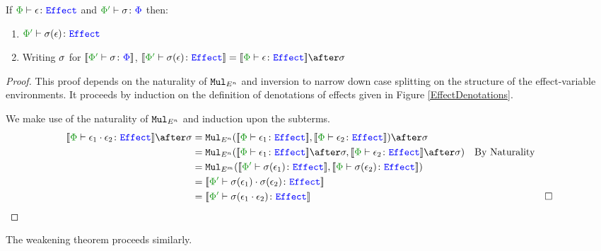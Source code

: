 \begin{framed}
    \begin{theorem}\label{EffectSubstitutionOnEffects} 
        If $\wellformedeffect{\P}{\e}$ and $\typerelation{\P'}{\si}{\P}$ then: 
        \begin{enumerate}[label=\roman*.]
            \item $\wellformedeffect{\P'}{\si(\e)}$
            \item Writing $\sigma$ for $\deno{\typerelation{\P'}{\si}{\P}}$,  $\deno{\wellformedeffect{\P'}{\si(\e)}} = \deno{\wellformedeffect{\P}{\e}}\after\si$
        \end{enumerate}
          
    \end{theorem}
    
    \begin{proof}
        This proof depends on the naturality of $\texttt{Mul}_{E^n}$ and inversion to narrow down case splitting on the structure of the effect-variable environments. It proceeds by induction on the definition of denotations of effects given in Figure \ref{EffectDenotations}.
    
    \case{\ecompose}
    
    We make use of the naturality of $\texttt{Mul}_{E^n}$ and induction upon the subterms.
    \begin{align*}
        \deno{\typerelation{\P}{\e_1\dot\e_2}{\effect}} \after\si &=
        \Mul_{E^n}(\deno{\typerelation{\P}{\e_1}{\effect}}, \deno{\typerelation{\P}{\e_2}{\effect}})\after \si \\
        & = \Mul_{E^n}(\deno{\typerelation{\P}{\e_1}{\effect}}\after \si, \deno{\typerelation{\P}{\e_2}{\effect}}\after \si)\qt{By Naturality}\\
        & = \Mul_{E^m}(\deno{\typerelation{\P'}{\si(\e_1)}{\effect}}, \deno{\typerelation{\P}{\si(\e_2)}{\effect}})\\
        & = \deno{\typerelation{\P'}{\si(\e_1)\dot\si(\e_2)}{\effect}}\\
        & = \deno{\typerelation{\P'}{\si(\e_1\dot\e_2)}{\effect}}&\square
    \end{align*}   
    \end{proof}
\end{framed}

The weakening theorem proceeds similarly.


